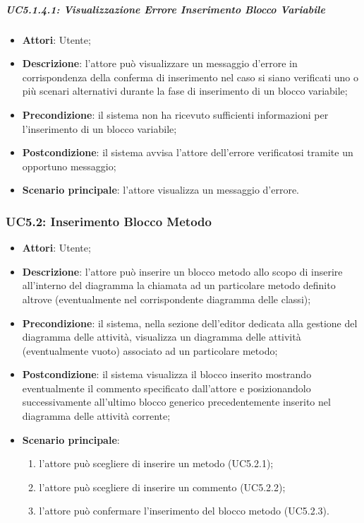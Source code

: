 \subparagraph{UC5.1.4.1: Visualizzazione Errore Inserimento Blocco Variabile	}
\label{UC5.1.4.1}
\begin{itemize}
\item \textbf{Attori}: Utente;
\item \textbf{Descrizione}: l'attore può visualizzare un messaggio d'errore in corrispondenza della conferma di inserimento nel caso si siano verificati uno o più scenari alternativi durante la fase di inserimento di un blocco variabile;	
\item \textbf{Precondizione}: il sistema non ha ricevuto sufficienti informazioni per l'inserimento di un blocco variabile;	
\item \textbf{Postcondizione}: il sistema avvisa l'attore dell'errore verificatosi tramite un opportuno messaggio;	
\item \textbf{Scenario principale}:
l'attore visualizza un messaggio d'errore.	
\end{itemize}

\subsubsection{UC5.2: Inserimento Blocco Metodo}
\label{UC5.2}
\begin{itemize}
\item \textbf{Attori}: Utente;
\item \textbf{Descrizione}: l'attore può inserire un blocco metodo allo scopo di inserire all'interno del diagramma la chiamata ad un particolare metodo definito altrove (eventualmente nel corrispondente diagramma delle classi);	
\item \textbf{Precondizione}: il sistema, nella sezione dell'editor dedicata alla gestione del diagramma delle attività, visualizza un diagramma delle attività (eventualmente vuoto) associato ad un particolare metodo;	
\item \textbf{Postcondizione}:  il sistema visualizza il blocco inserito mostrando eventualmente il commento specificato dall'attore e posizionandolo successivamente all'ultimo blocco generico precedentemente inserito nel diagramma delle attività corrente;
\item \textbf{Scenario principale}:
\begin{enumerate}
\item l'attore può scegliere di inserire un metodo (UC5.2.1);
\item l'attore può scegliere di inserire un commento (UC5.2.2);
\item l'attore può confermare l'inserimento del blocco metodo (UC5.2.3).
\end{enumerate}
\end{itemize}

